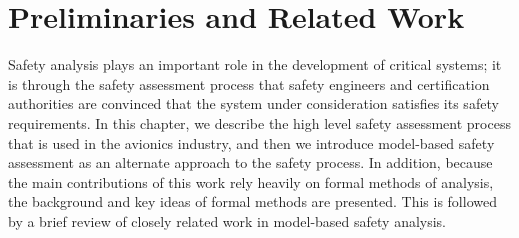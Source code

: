 \chapter{Preliminaries and Related Work}
\label{chap:prelim}
Safety analysis plays an important role in the development of critical systems; it is through the safety assessment process that safety engineers and certification authorities are convinced that the system under consideration satisfies its safety requirements. In this chapter, we describe the high level safety assessment process that is used in the avionics industry, and then we introduce model-based safety assessment as an alternate approach to the safety process. In addition, because the main contributions of this work rely heavily on formal methods of analysis, the background and key ideas of formal methods are presented. This is followed by a brief review of closely related work in model-based safety analysis. 









%
%



%
%


%
%
%
